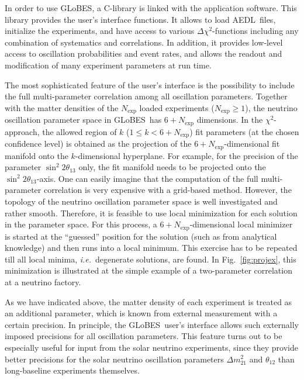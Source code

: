 \documentclass[12pt,a4paper]{article}
\newcommand{\ie}{{\it i.e.}}
\newcommand{\fig}{Fig.}
\newcommand{\sdm}{\Delta m_{21}^2}
\newcommand{\stheta}{\sin^2 2 \theta_{13}}
\newcommand{\GLOBES}{{\sf GLoBES}}
\newcommand{\AEDL}{{\sf AEDL}}
\newcommand{\figu}[1]{\fig~\ref{fig:#1}}
\begin{document}
In order to use \GLOBES , a C-library is linked with the application
software. This library provides the user's interface functions.
It allows to load \AEDL\ files, initialize the experiments, and
have access to various $\Delta \chi^2$-functions including any combination
of systematics and correlations. In addition, it provides low-level
access to oscillation probabilities and event rates, and allows
the readout and modification of many experiment parameters at run time.

The most sophisticated feature of the user's interface is the
possibility to include the full multi-parameter correlation among
all oscillation parameters. Together with the matter densities
of the $N_{\mathrm{exp}}$ loaded experiments ($N_{\mathrm{exp}} \ge 1$), the neutrino oscillation parameter space in \GLOBES\ has $6+N_{\mathrm{exp}}$ dimensions. In the $\chi^2$-approach,
the allowed region of $k$ ($1\le k<6+N_{\mathrm{exp}}$) fit parameters (at the chosen confidence level) is obtained as the projection of the $6+N_{\mathrm{exp}}$-dimensional fit manifold onto the $k$-dimensional hyperplane. For example,
for the precision of the parameter $\stheta$ only, the fit manifold
needs to be projected onto the $\stheta$-axis. One can easily imagine
that the computation of the full multi-parameter correlation is
very expensive with a grid-based method. However, the topology
of the neutrino oscillation parameter space is well investigated and
rather smooth. Therefore, it is feasible to use local minimization for each
solution in the parameter space.  For this process, 
a $6+N_{\mathrm{exp}}$-dimensional local minimizer
is started at the ``guessed'' position for the solution
(such as from analytical knowledge) and then runs into a
local minimum. This exercise has to be repeated till all local 
minima, \ie\ degenerate solutions, are found. In \figu{projex},
this minimization is illustrated at the simple example of a 
two-parameter correlation at a neutrino factory.

As we have indicated above, the matter density of
each experiment is treated as an additional parameter, which is known
from external measurement with a certain precision. In principle, 
the \GLOBES\ user's interface allows such externally imposed
precisions for all oscillation parameters. This feature turns out
to be especially useful for input from the solar neutrino experiments,
since they provide better precisions for the solar neutrino
oscillation parameters $\sdm$ and $\theta_{12}$ than long-baseline
 experiments themselves.
\end{document}
